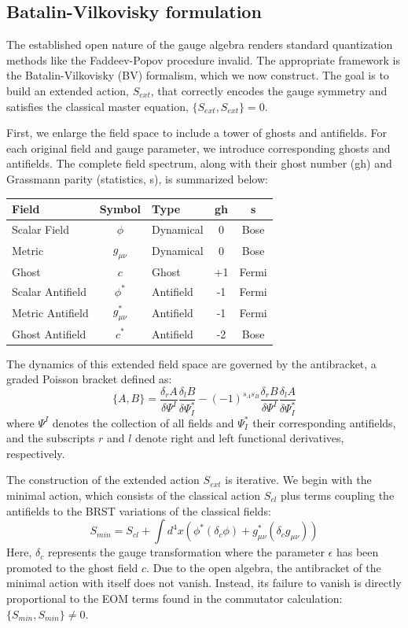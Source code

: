 \documentclass[twocolumn]{aastex631}
\begin{document}
\subsection{Batalin-Vilkovisky formulation}
The established open nature of the gauge algebra renders standard quantization methods like the Faddeev-Popov procedure invalid. The appropriate framework is the Batalin-Vilkovisky (BV) formalism, which we now construct. The goal is to build an extended action, $S_{ext}$, that correctly encodes the gauge symmetry and satisfies the classical master equation, $\{S_{ext}, S_{ext}\} = 0$.

First, we enlarge the field space to include a tower of ghosts and antifields. For each original field and gauge parameter, we introduce corresponding ghosts and antifields. The complete field spectrum, along with their ghost number (gh) and Grassmann parity (statistics, s), is summarized below:
\begin{center}
\begin{tabular}{|l|c|l|c|c|}
\hline
\textbf{Field} & \textbf{Symbol} & \textbf{Type} & \textbf{gh} & \textbf{s} \\ \hline
Scalar Field & $\phi$ & Dynamical & 0 & Bose \\
Metric & $g_{\mu\nu}$ & Dynamical & 0 & Bose \\
Ghost & $c$ & Ghost & +1 & Fermi \\
Scalar Antifield & $\phi^*$ & Antifield & -1 & Fermi \\
Metric Antifield & $g_{\mu\nu}^*$ & Antifield & -1 & Fermi \\
Ghost Antifield & $c^*$ & Antifield & -2 & Bose \\ \hline
\end{tabular}
\end{center}

The dynamics of this extended field space are governed by the antibracket, a graded Poisson bracket defined as:
\begin{equation}
\{A, B\} = \frac{\delta_r A}{\delta \Psi^I} \frac{\delta_l B}{\delta \Psi^*_I} - (-1)^{s_A s_B} \frac{\delta_r B}{\delta \Psi^I} \frac{\delta_l A}{\delta \Psi^*_I}
\end{equation}
where $\Psi^I$ denotes the collection of all fields and $\Psi^*_I$ their corresponding antifields, and the subscripts $r$ and $l$ denote right and left functional derivatives, respectively.

The construction of the extended action $S_{ext}$ is iterative. We begin with the minimal action, which consists of the classical action $S_{cl}$ plus terms coupling the antifields to the BRST variations of the classical fields:
\begin{equation}
S_{min} = S_{cl} + \int d^4x \left( \phi^* (\delta_c \phi) + g_{\mu\nu}^* (\delta_c g_{\mu\nu}) \right)
\end{equation}
Here, $\delta_c$ represents the gauge transformation where the parameter $\epsilon$ has been promoted to the ghost field $c$. Due to the open algebra, the antibracket of the minimal action with itself does not vanish. Instead, its failure to vanish is directly proportional to the EOM terms found in the commutator calculation: $\{S_{min}, S_{min}\} \neq 0$.
\end{document}
